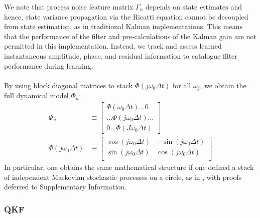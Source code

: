 We note that process noise feature matrix $\Gamma_{n}$ depends on state estimates and hence, state variance propagation via the Ricatti equation cannot be decoupled from state estimation, as in traditional Kalman implementations. This means that the performance of the filter and pre-calculations of the Kalman gain are not permitted in this implementation. Instead, we track and assess learned instantaneous amplitude, phase, and residual information to catalogue filter performance during learning. 
\\
\\
By using block diagonal matrices to stack $\Phi(j \omega_0 \Delta t) $ for all $\omega_j$, we obtain the full dynamical model $\Phi_n$:
\begin{align}
\Phi_{n} & \equiv \begin{bmatrix} 
\Phi(\omega_0 \Delta t)\hdots 0  \\ 
 \hdots \Phi(j\omega_0 \Delta t) \hdots \\
0 \hdots \Phi(J \omega_0 \Delta t)  \end{bmatrix}\\ 
\Phi(j \omega_0 \Delta t) &\equiv \begin{bmatrix} \cos(j \omega_0 \Delta t) & -\sin(j \omega_0 \Delta t) \\ \sin(j \omega_0 \Delta t) & \cos(j \omega_0 \Delta t) \\ \end{bmatrix} \label{eqn:ap_approxSP:LKFFB_Phi} 
\end{align}
In particular, one obtains the same mathematical structure if one defined a stack of independent Markovian stochastic processes on a circle, as in \cite{karlin2012}, with proofs deferred to Supplementary Information. 

\subsubsection{QKF}

